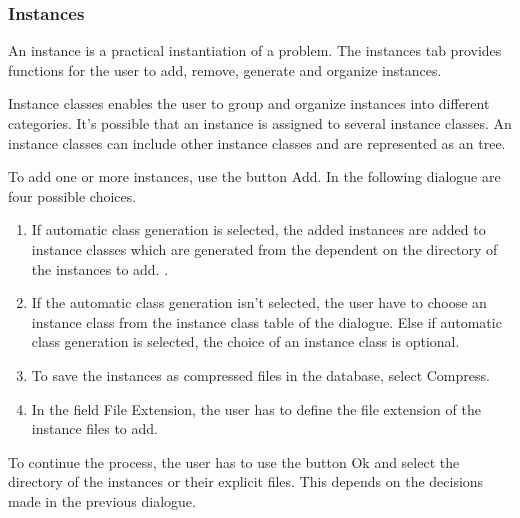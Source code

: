 \subsubsection{Instances}
 An instance is a practical instantiation of a problem. The instances tab provides functions for the user to add, remove, generate and organize instances.

 Instance classes enables the user to group and organize instances into different categories. It's possible that an instance is assigned to several instance classes. An instance classes can include other instance classes and are represented as an tree.

 To add one or more instances, use the button Add. In the following dialogue are four possible choices. 
\begin{enumerate}
	\item If automatic class generation is selected, the added instances are added to instance classes which
	are generated from the dependent on the directory of the instances to add. .
	
	\item If the automatic class generation isn't selected, the user have to choose an instance class from the 		instance class table of the dialogue. Else if automatic class generation is selected, the choice of an 			instance class is optional.
	
	\item To save the instances as compressed files in the database, select Compress.
	
	\item In the field File Extension, the user has to define the file extension of the instance files to add.
\end{enumerate}

To continue the process, the user has to use the button Ok and select the directory of the instances or their explicit files. This depends on the decisions made in the previous dialogue.
 





